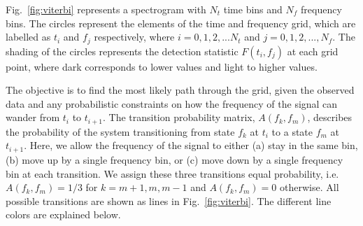 \documentclass[paper-main.tex]{subfiles}
\begin{document}
Fig.~\ref{fig:viterbi} represents a spectrogram with $N_t$ time bins and $N_f$ frequency bins.
The circles represent the elements of the time and frequency grid, which are labelled as  
$t_i$ and $f_j$ respectively, where $i=0,1,2,...N_t$ and $j=0,1,2,...,N_f$. 
The shading of the circles represents the detection statistic $F(t_i,f_j)$ at each grid point, where dark corresponds to lower values and light to higher values. 


The objective is to find the most likely path through the grid, given the observed data and any probabilistic constraints on how the frequency of the signal can wander from $t_i$ to $t_{i+1}$. 
The transition probability matrix, $A(f_k,f_m)$, describes the probability of the system transitioning from state $f_k$ at $t_i$ to a state $f_{m}$ at $t_{i+1}$. 
Here, we allow the frequency of the signal to either (a) stay in the same bin, (b) move up by a single frequency bin, or (c) move down by a single frequency bin at each transition. 
We assign these three transitions equal probability, i.e.\ $A(f_k,f_m)=1/3$ for $k=m+1,m,m-1$ and $A(f_k,f_m)=0$ otherwise.
All possible transitions are shown as lines in Fig.~\ref{fig:viterbi}.
The different line colors are explained below. 
\end{document}

